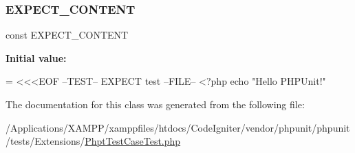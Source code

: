 \subsubsection{\texorpdfstring{E\+X\+P\+E\+C\+T\+\_\+\+C\+O\+N\+T\+E\+NT}{EXPECT\_CONTENT}}
{\footnotesize\ttfamily const E\+X\+P\+E\+C\+T\+\_\+\+C\+O\+N\+T\+E\+NT}

{\bfseries Initial value\+:}
\begin{DoxyCode}
= <<<EOF
--TEST--
EXPECT test
--FILE--
<?php echo \textcolor{stringliteral}{"Hello PHPUnit!"}
\end{DoxyCode}


The documentation for this class was generated from the following file\+:\begin{DoxyCompactItemize}
\item 
/\+Applications/\+X\+A\+M\+P\+P/xamppfiles/htdocs/\+Code\+Igniter/vendor/phpunit/phpunit/tests/\+Extensions/\mbox{\hyperlink{_phpt_test_case_test_8php}{Phpt\+Test\+Case\+Test.\+php}}\end{DoxyCompactItemize}
